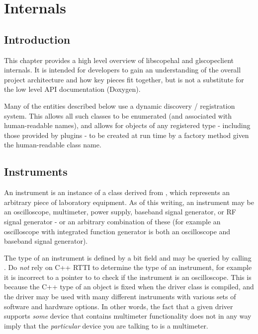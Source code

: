 \chapter{Internals}

\section{Introduction}

This chapter provides a high level overview of libscopehal and glscopeclient internals. It is intended for developers
to gain an understanding of the overall project architecture and how key pieces fit together, but is not a substitute
for the low level API documentation (Doxygen).

Many of the entities described below use a dynamic discovery / registration system. This allows all such classes to be
enumerated (and associated with human-readable names), and allows for objects of any registered type - including those
provided by plugins - to be created at run time by a factory method given the human-readable class name.

\section{Instruments}
\label{sec:instruments}

An instrument is an instance of a class derived from , which represents an arbitrary piece of
laboratory equipment. As of this writing, an instrument may be an oscilloscope, multimeter, power supply, baseband
signal generator, or RF signal generator - or an arbitrary combination of these (for example an oscilloscope with
integrated function generator is both an oscilloscope and baseband signal generator).

The type of an instrument is defined by a bit field and may be queried by calling . Do
\emph{not} rely on C++ RTTI to determine the type of an instrument, for example it is incorrect to
 a  pointer to  to check if the instrument is
an oscilloscope. This is because the C++ type of an object is fixed when the driver class is compiled, and the driver
may be used with many different instruments with various sets of software and hardware options. In other words, the
fact that a given driver supports \emph{some} device that contains multimeter functionality does not in any way imply
that the \emph{particular} device you are talking to is a multimeter.


